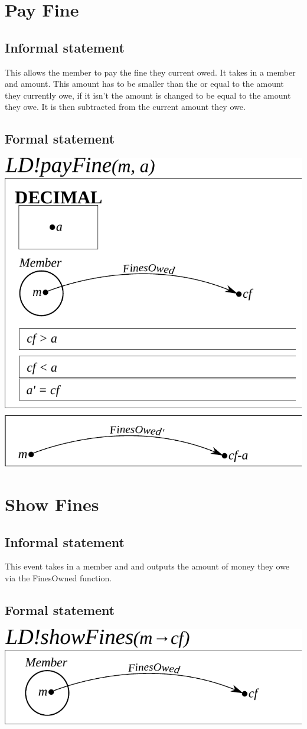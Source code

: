 \documentclass[]{report}
\begin{document}
\section{Pay Fine}
\subsection{Informal statement}
This allows the member to pay the fine they current owed. It takes in a member and amount. This amount has to be smaller than the or equal to the amount they currently owe, if it isn't the amount is changed to be equal to the amount they owe. It is then subtracted from the current amount they owe.
\subsection{Formal statement}
\begin{center}
	\includegraphics{pay_fine.pdf}
\end{center}
\newpage
\section{Show Fines}
\subsection{Informal statement}
This event takes in a member and and outputs the amount of money they owe via the FinesOwned function.
\subsection{Formal statement}
\begin{center}
	\includegraphics{show_fines.pdf}
\end{center}
\newpage
\end{document}
